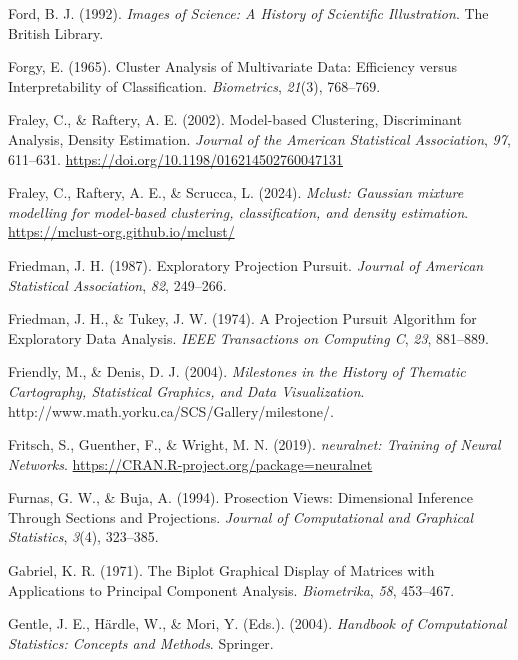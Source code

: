 \documentclass[
  letterpaper,
]{krantz}
\newlength{\cslhangindent}
\newenvironment{CSLReferences}[2] %
 {\begin{list}{}{%
  \setlength{\itemindent}{0pt}
  \setlength{\leftmargin}{0pt}
  \setlength{\parsep}{0pt}
  \ifodd #1
   \setlength{\leftmargin}{\cslhangindent}
   \setlength{\itemindent}{-1\cslhangindent}
  \fi
  \setlength{\itemsep}{#2\baselineskip}}}
 {\end{list}}
\begin{document}
\begin{CSLReferences}{1}{0}
Ford, B. J. (1992). \emph{Images of {S}cience: {A} {H}istory of
{S}cientific {I}llustration}. The British Library.

Forgy, E. (1965). Cluster {A}nalysis of {M}ultivariate {D}ata:
{E}fficiency versus {I}nterpretability of {C}lassification.
\emph{Biometrics}, \emph{21}(3), 768--769.

Fraley, C., \& Raftery, A. E. (2002). Model-based {C}lustering,
{D}iscriminant {A}nalysis, {D}ensity {E}stimation. \emph{Journal of the
American Statistical Association}, \emph{97}, 611--631.
\url{https://doi.org/10.1198/016214502760047131}

Fraley, C., Raftery, A. E., \& Scrucca, L. (2024). \emph{Mclust:
Gaussian mixture modelling for model-based clustering, classification,
and density estimation}. \url{https://mclust-org.github.io/mclust/}

Friedman, J. H. (1987). {E}xploratory {P}rojection {P}ursuit.
\emph{Journal of American Statistical Association}, \emph{82}, 249--266.

Friedman, J. H., \& Tukey, J. W. (1974). {A} {P}rojection {P}ursuit
{A}lgorithm for {E}xploratory {D}ata {A}nalysis. \emph{IEEE Transactions
on Computing C}, \emph{23}, 881--889.

Friendly, M., \& Denis, D. J. (2004). \emph{Milestones in the {H}istory
of {T}hematic {C}artography, {S}tatistical {G}raphics, and {D}ata
{V}isualization}. http://www.math.yorku.ca/SCS/Gallery/milestone/.

Fritsch, S., Guenther, F., \& Wright, M. N. (2019). \emph{{neuralnet}:
{T}raining of {N}eural {N}etworks}.
\url{https://CRAN.R-project.org/package=neuralnet}

Furnas, G. W., \& Buja, A. (1994). Prosection {V}iews: {D}imensional
{I}nference {T}hrough {S}ections and {P}rojections. \emph{Journal of
Computational and Graphical Statistics}, \emph{3}(4), 323--385.

Gabriel, K. R. (1971). The {B}iplot {G}raphical {D}isplay of {M}atrices
with {A}pplications to {P}rincipal {C}omponent {A}nalysis.
\emph{Biometrika}, \emph{58}, 453--467.

Gentle, J. E., Härdle, W., \& Mori, Y. (Eds.). (2004). \emph{Handbook of
{C}omputational {S}tatistics: {C}oncepts and {M}ethods}. Springer.


\end{CSLReferences}
\end{document}
